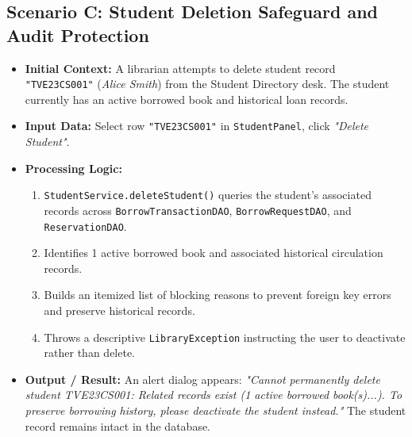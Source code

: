 \subsection{Scenario C: Student Deletion Safeguard and Audit Protection}
\begin{itemize}
    \item \textbf{Initial Context:} A librarian attempts to delete student record \texttt{"TVE23CS001"} (\textit{Alice Smith}) from the Student Directory desk. The student currently has an active borrowed book and historical loan records.
    \item \textbf{Input Data:} Select row \texttt{"TVE23CS001"} in \texttt{StudentPanel}, click \textit{"Delete Student"}.
    \item \textbf{Processing Logic:}
    \begin{enumerate}
        \item \texttt{StudentService.deleteStudent()} queries the student's associated records across \texttt{BorrowTransactionDAO}, \texttt{BorrowRequestDAO}, and \texttt{ReservationDAO}.
        \item Identifies 1 active borrowed book and associated historical circulation records.
        \item Builds an itemized list of blocking reasons to prevent foreign key errors and preserve historical records.
        \item Throws a descriptive \texttt{LibraryException} instructing the user to deactivate rather than delete.
    \end{enumerate}
    \item \textbf{Output / Result:} An alert dialog appears: \textit{"Cannot permanently delete student TVE23CS001: Related records exist (1 active borrowed book(s)...). To preserve borrowing history, please deactivate the student instead."} The student record remains intact in the database.
\end{itemize}
